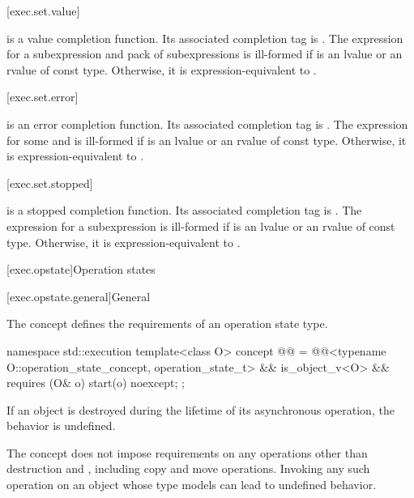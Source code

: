 [exec.set.value]{}

\pnum
{} is a value completion function.
Its associated completion tag is .
The expression 
for a subexpression  and
pack of subexpressions  is ill-formed
if  is an lvalue or an rvalue of const type.
Otherwise, it is expression-equivalent to
.

[exec.set.error]{}

\pnum
{} is an error completion function.
Its associated completion tag is .
The expression 
for some   and  is ill-formed
if  is an lvalue or an rvalue of const type.
Otherwise, it is expression-equivalent to
.

[exec.set.stopped]{}

\pnum
{} is a stopped completion function.
Its associated completion tag is .
The expression 
for a subexpression  is ill-formed
if  is an lvalue or an rvalue of const type.
Otherwise, it is expression-equivalent to
.

[exec.opstate]{Operation states}

[exec.opstate.general]{General}

\pnum
The  concept defines
the requirements of an operation state type.
\begin{codeblock}
namespace std::execution {
  template<class O>
    concept @@ =
      @@<typename O::operation_state_concept, operation_state_t> &&
      is_object_v<O> &&
      requires (O& o) {
        { start(o) } noexcept;
      };
}
\end{codeblock}

\pnum
If an  object is destroyed
during the lifetime of its asynchronous operation,
the behavior is undefined.
\begin{note}
The  concept does not impose requirements
on any operations other than destruction and ,
including copy and move operations.
Invoking any such operation on an object
whose type models  can lead to undefined behavior.
\end{note}

